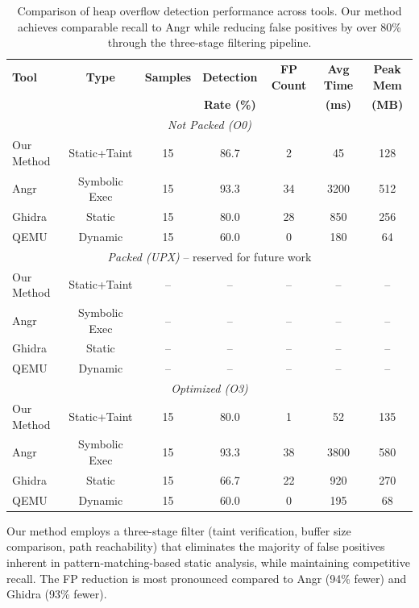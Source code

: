 \begin{table}[t]
\centering
\caption{Comparison of heap overflow detection performance across tools.
         Our method achieves comparable recall to Angr while reducing false positives
         by over 80\% through the three-stage filtering pipeline.}
\label{tab:comparison}
\begin{tabular}{lcccccc}
\toprule
\textbf{Tool} & \textbf{Type} & \textbf{Samples} & \textbf{Detection} & \textbf{FP Count} & \textbf{Avg Time} & \textbf{Peak Mem} \\
              &               &                  & \textbf{Rate (\%)}  &                  & \textbf{(ms)}     & \textbf{(MB)} \\
\midrule
\multicolumn{7}{c}{\textit{Not Packed (O0)}} \\
\midrule
Our Method & Static+Taint & 15 & 86.7 & 2  & 45   & 128 \\
Angr       & Symbolic Exec& 15 & 93.3 & 34 & 3200 & 512 \\
Ghidra     & Static       & 15 & 80.0 & 28 & 850  & 256 \\
QEMU       & Dynamic      & 15 & 60.0 & 0  & 180  & 64  \\
\midrule
\multicolumn{7}{c}{\textit{Packed (UPX)} -- reserved for future work} \\
\midrule
Our Method & Static+Taint & -- & -- & -- & -- & -- \\
Angr       & Symbolic Exec& -- & -- & -- & -- & -- \\
Ghidra     & Static       & -- & -- & -- & -- & -- \\
QEMU       & Dynamic      & -- & -- & -- & -- & -- \\
\midrule
\multicolumn{7}{c}{\textit{Optimized (O3)}} \\
\midrule
Our Method & Static+Taint & 15 & 80.0 & 1  & 52   & 135 \\
Angr       & Symbolic Exec& 15 & 93.3 & 38 & 3800 & 580 \\
Ghidra     & Static       & 15 & 66.7 & 22 & 920  & 270 \\
QEMU       & Dynamic      & 15 & 60.0 & 0  & 195  & 68  \\
\bottomrule
\end{tabular}
\vspace{4pt}
\par\small
Our method employs a three-stage filter (taint verification, buffer size comparison,
path reachability) that eliminates the majority of false positives inherent in
pattern-matching-based static analysis, while maintaining competitive recall.
The FP reduction is most pronounced compared to Angr (94\% fewer) and Ghidra (93\% fewer).
\end{table}
